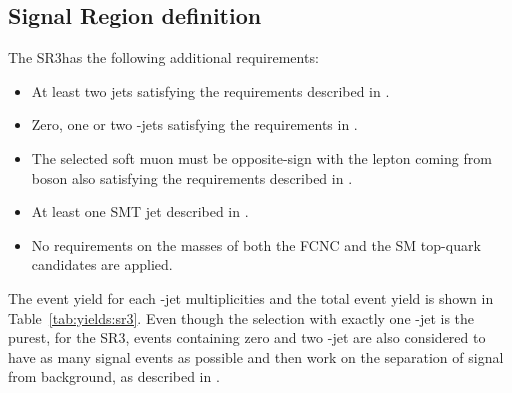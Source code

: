 \subsection {Signal Region definition}
\label{sec:sel:sr3}
The SR3\tZc has the following additional requirements:
\begin{itemize}
	\item At least two jets satisfying the requirements described in . 
	\item Zero, one or two \Pqb-jets satisfying the requirements in . 
	\item The selected soft muon must be opposite-sign with the lepton coming from \PW boson also satisfying the requirements described in  .
	\item At least one SMT jet described in . 
	\item No requirements on the masses of both the FCNC and the SM top-quark candidates are applied. 
\end{itemize}
The event yield for each \Pqb-jet multiplicities and the total event yield is shown in Table~\ref{tab:yields:sr3}. 
Even though the selection with exactly one \Pqb-jet is the purest, for the SR3\tZc, events containing zero and two \Pqb-jet are also considered to have as many signal events as possible and then work on the separation of signal from background, as described in .
